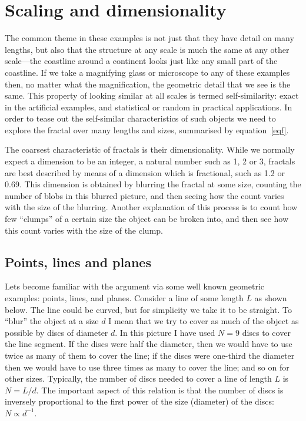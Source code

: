 \documentclass[12pt]{article}
\let\ltxsect\section
\renewcommand{\section}{\newpage\ltxsect}
\begin{document}
 \newpage



\section{Scaling and dimensionality}
\label{sdim}

The common theme in these examples is not just that they have detail 
on many lengths, but also that the structure at any scale is much the 
same at any other scale---the coastline around a continent looks just 
like any small part of the coastline.  If we take a magnifying glass 
or microscope to any of these examples then, no matter what the 
magnification, the geometric detail that we see is the same.  This 
property of looking similar at all scales is termed self-similarity: 
exact in the artificial examples, and statistical or random in 
practical applications.  In order to tease out the self-similar 
characteristics of such objects we need to explore the fractal over 
many lengths and sizes, summarised by equation~\cref{eqf}.  

\newpage

The coarsest characteristic of fractals is their dimensionality.  
While we normally expect a dimension to be an integer, a natural 
number such as 1, 2 or 3, fractals are best described by means of a 
dimension which is fractional, such as 1.2 or 0.69.  This dimension 
is obtained by blurring the fractal at some size, counting the number 
of blobs in this blurred picture, and then seeing how the count 
varies with the size of the blurring.  Another explanation of this 
process is to count how few ``clumps'' of a certain size the object can 
be broken into, and then see how this count varies with the size of 
the clump.  

\newpage

\subsection{Points, lines and planes}
\label{seuclid}

Lets become familiar with the argument via some well known geometric 
examples: points, lines, and planes.  Consider a line of some length 
$L$ as shown below.  The line could be curved, but for simplicity 
we take it to be straight.  To ``blur'' the object at a size
\(
	d
\)
I mean that we try to cover as much of the object as possible by discs 
of diameter $d$.  In this picture I have used
\(
	N=9
\)
discs to cover the line segment.  If the discs were half the diameter, 
then we would have to use twice as many of them to cover the line; if 
the discs were one-third the diameter then we would have to use three 
times as many to cover the line; and so on for other sizes.  
Typically, the number of discs needed to cover a line of length \( L 
\) is $N=L/d$.  The important aspect of this relation is that the 
number of discs is inversely proportional to the first power of the 
size (diameter) of the discs: $N\propto d^{-1}$.
\end{document}
